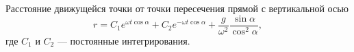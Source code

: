 Расстояние движущейся точки от точки пересечения прямой с вертикальной осью
$$r = C_1e^{\omega t\cos{\alpha}} + C_2e^{-\omega t\cos{\alpha}} +
\frac{g}{\omega^2}\frac{\sin{\alpha}}{\cos^2{\alpha}},$$
где $C_1$ и $C_2$ --- постоянные интегрирования.
